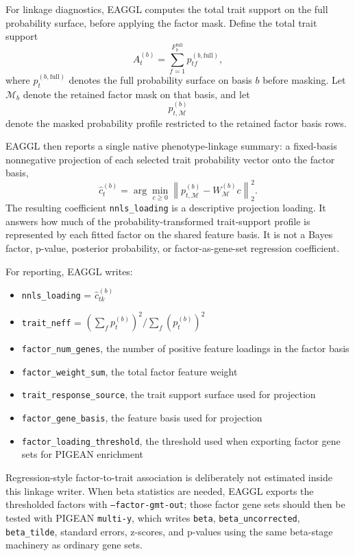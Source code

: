 \documentclass[11pt]{article}
\begin{document}
For linkage diagnostics, EAGGL computes the total trait support on the full probability surface, before applying the factor mask. Define the total trait support
\begin{equation}
A_t^{(b)} = \sum_{f=1}^{F_b^{\mathrm{full}}} p_{tf}^{(b,\mathrm{full})},
\label{eq:eaggl_pheno_strength}
\end{equation}
where $p_t^{(b,\mathrm{full})}$ denotes the full probability surface on basis $b$ before masking. Let $\mathcal{M}_b$ denote the retained factor mask on that basis, and let
\[
p_{t,\mathcal{M}}^{(b)}
\]
denote the masked probability profile restricted to the retained factor basis rows.

EAGGL then reports a single native phenotype-linkage summary: a fixed-basis nonnegative projection of each selected trait probability vector onto the factor basis,
\begin{equation}
\hat c_t^{(b)}
=
\arg\min_{c \ge 0}
\left\|
p_{t,\mathcal{M}}^{(b)} - W_{\mathcal{M}}^{(b)} c
\right\|_2^2.
\label{eq:eaggl_trait_linkage_nnls}
\end{equation}
The resulting coefficient \texttt{nnls\_loading} is a descriptive projection loading. It answers how much of the probability-transformed trait-support profile is represented by each fitted factor on the shared feature basis. It is not a Bayes factor, p-value, posterior probability, or factor-as-gene-set regression coefficient.

For reporting, EAGGL writes:
\begin{itemize}
\item \texttt{nnls\_loading} = $\hat c_{tk}^{(b)}$
\item \texttt{trait\_neff} = $\left(\sum_f p_t^{(b)}\right)^2 \big/ \sum_f \left(p_t^{(b)}\right)^2$
\item \texttt{factor\_num\_genes}, the number of positive feature loadings in the factor basis
\item \texttt{factor\_weight\_sum}, the total factor feature weight
\item \texttt{trait\_response\_source}, the trait support surface used for projection
\item \texttt{factor\_gene\_basis}, the feature basis used for projection
\item \texttt{factor\_loading\_threshold}, the threshold used when exporting factor gene sets for PIGEAN enrichment
\end{itemize}

Regression-style factor-to-trait association is deliberately not estimated inside this linkage writer. When beta statistics are needed, EAGGL exports the thresholded factors with \texttt{--factor-gmt-out}; those factor gene sets should then be tested with PIGEAN \texttt{multi-y}, which writes \texttt{beta}, \texttt{beta\_uncorrected}, \texttt{beta\_tilde}, standard errors, z-scores, and p-values using the same beta-stage machinery as ordinary gene sets.
\end{document}

